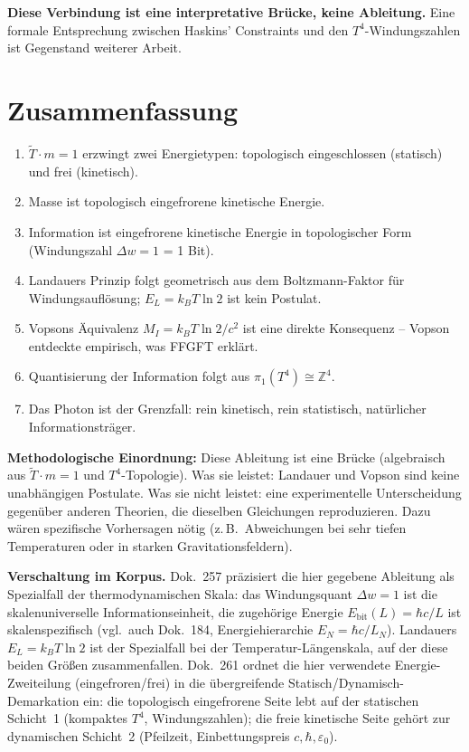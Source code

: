 \textbf{Diese Verbindung ist eine interpretative Brücke, keine Ableitung.}
Eine formale Entsprechung zwischen Haskins' Constraints und
den \(T^4\)-Windungszahlen ist Gegenstand weiterer Arbeit.

\section{Zusammenfassung}

\begin{enumerate}
  \item \(\tilde{T} \cdot m = 1\) erzwingt zwei Energietypen:
        topologisch eingeschlossen (statisch) und frei (kinetisch).
  \item Masse ist topologisch eingefrorene kinetische Energie.
  \item Information ist eingefrorene kinetische Energie
        in topologischer Form (Windungszahl \(\Delta w = 1\) = 1 Bit).
  \item Landauers Prinzip folgt geometrisch aus dem Boltzmann-Faktor
        für Windungsauflösung; \(E_L = k_BT\ln 2\) ist kein Postulat.
  \item Vopsons Äquivalenz \(M_I = k_BT\ln2/c^2\) ist eine direkte
        Konsequenz -- Vopson entdeckte empirisch, was FFGFT erklärt.
  \item Quantisierung der Information folgt aus \(\pi_1(T^4)\cong\mathbb{Z}^4\).
  \item Das Photon ist der Grenzfall: rein kinetisch, rein statistisch,
        natürlicher Informationsträger.
\end{enumerate}

\bigskip
\noindent
\textbf{Methodologische Einordnung:}
Diese Ableitung ist eine Brücke (algebraisch aus \(\tilde{T}\cdot m=1\)
und \(T^4\)-Topologie).
Was sie leistet: Landauer und Vopson sind keine unabhängigen Postulate.
Was sie nicht leistet: eine experimentelle Unterscheidung gegenüber
anderen Theorien, die dieselben Gleichungen reproduzieren.
Dazu wären spezifische Vorhersagen nötig (z.\,B.\ Abweichungen bei
sehr tiefen Temperaturen oder in starken Gravitationsfeldern).

\bigskip
\noindent
\textbf{Verschaltung im Korpus.}
Dok.~257 präzisiert die hier gegebene Ableitung als Spezialfall
der thermodynamischen Skala: das Windungsquant \(\Delta w = 1\) ist
die skalenuniverselle Informationseinheit, die zugehörige Energie
\(E_\text{bit}(L) = \hbar c/L\) ist skalenspezifisch
(vgl.\ auch Dok.~184, Energiehierarchie \(E_N = \hbar c/L_N\)).
Landauers \(E_L = k_B T \ln 2\) ist der Spezialfall bei der
Temperatur-Längenskala, auf der diese beiden Größen zusammenfallen.
Dok.~261 ordnet die hier verwendete Energie-Zweiteilung
(eingefroren/frei) in die übergreifende Statisch/Dynamisch-Demarkation
ein: die topologisch eingefrorene Seite lebt auf der statischen
Schicht~1 (kompaktes \(T^4\), Windungszahlen); die freie kinetische
Seite gehört zur dynamischen Schicht~2 (Pfeilzeit, Einbettungspreis
\(c,\hbar,\varepsilon_0\)).

